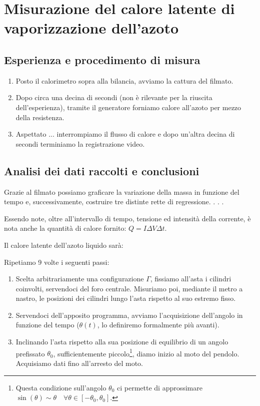 \documentclass{article}
\begin{document}
\pagebreak
\section{Misurazione del calore latente di vaporizzazione dell'azoto}

\subsection{Esperienza e procedimento di misura}

\begin{enumerate}
  \item
    Posto il calorimetro sopra alla bilancia, avviamo la cattura del filmato.
  \item
    Dopo circa una decina di secondi (non è rilevante per la riuscita dell'esperienza),
    tramite il generatore forniamo calore all'azoto per mezzo della resistenza.
  \item
    Aspettato ... interrompiamo il flusso di calore e dopo 
    un'altra decina di secondi terminiamo la registrazione video.
\end{enumerate}
    
\subsection{Analisi dei dati raccolti e conclusioni}
  Grazie al filmato possiamo graficare la variazione della massa in funzione del tempo
  e, successivamente, costruire tre distinte rette di regressione.
  .
  .
  .
  
  Essendo note, oltre all'intervallo di tempo, tensione ed intensità della corrente,
  è nota anche la quantità di calore fornito: $Q = I \Delta V \Delta t$.

  Il calore latente dell'azoto liquido sarà:


  \item
    Ripetiamo 9 volte i seguenti passi:
  \begin{enumerate}
    \item
      Scelta arbitrariamente una configurazione $\Gamma$,
      fissiamo all'asta i cilindri coinvolti,
      servendoci del foro centrale.
      Misuriamo poi, mediante il metro a nastro,
      le posizioni dei cilindri lungo l'asta
      rispetto al suo estremo fisso.
    \item
      Servendoci dell'apposito programma, avviamo
      l'acquisizione dell'angolo in funzione del tempo
      ($\theta(t)$, lo definiremo formalmente più avanti).
    \item
      Inclinando l'asta rispetto alla sua posizione di equilibrio
      di un angolo prefissato $\theta_0$,
      sufficientemente piccolo\footnote{
Questa condizione sull'angolo $\theta_0$ ci permette di approssimare
$\sin(\theta) \sim \theta\quad\forall \theta \in [-\theta_0, \theta_0]$.
      }, diamo inizio al moto del pendolo.
      Acquisiamo dati fino all'arresto del moto.
  \end{enumerate}
\end{document}
